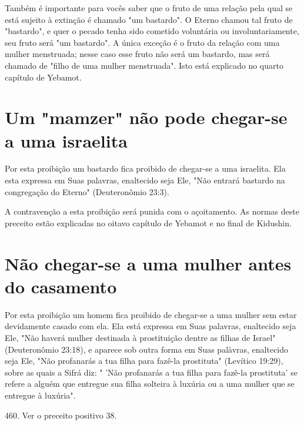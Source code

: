 \begin{itemize}
\begin{enumrate}
\begin{itemize}
\begin{itemize}
\begin{itemize}
Também é importante para vocês saber que o fruto de uma relação pela
qual se está sujeito à extinção é chamado "um bastardo". O Eterno
cha­mou tal fruto de "bastardo", e quer o pecado tenha sido cometido
voluntária ou involuntariamente, seu fruto será "um bastardo". A única
exceção é o fruto da relação com uma mulher menstruada; nesse caso esse
fruto não será um bas­tardo, mas será chamado de "filho de uma mulher
menstruada". Isto está ex­plicado no quarto capítulo de Yebamot.

\section{Um "mamzer" não pode chegar-se a uma israelita}

Por esta proibição um bastardo fica proibido de chegar-se a uma
is­raelita. Ela esta expressa em Suas palavras, enaltecido seja Ele,
"Não entrará bas­tardo na congregação do Eterno" (Deuteronômio 23:3).

A contravenção a esta proibição será punida com o açoitamento. As normas
deste preceito estão explicadas no oitavo capítulo de Ye­bamot e no
final de Kidushin.

\section{Não chegar-se a uma mulher antes do casamento}

Por esta proibição um homem fica proibido de chegar-se a uma mu­lher sem
estar devidamente casado com ela. Ela está expressa em Suas palavras,
enaltecido seja Ele, "Não haverá mulher destinada à prostituição dentre
as fi­lhas de Israel" (Deuteronômio 23:18), e aparece sob outra forma em
Suas palà­vras, enaltecido seja Ele, "Não profanarás a tua filha para
fazê-la prostituta" (Le­vítico 19:29), sobre as quais a Sifrá diz: "
'Não profanarás a tua filha para fazê-la prostituta' se refere a alguém
que entregue sua filha solteira à luxúria ou a uma mulher que se
entregue à luxúria".

460. Ver o preceito positivo 38.


\end{itemize}
\end{itemize}
\end{itemize}
\end{enumrate}
\end{itemize}
